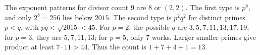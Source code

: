The exponent patterns for divisor count $9$ are $8$ or $(2,2)$. The first type is $p^8$, and only $2^8=256$ lies below $2015$. The second type is $p^2q^2$ for distinct primes $p<q$, with $pq<\sqrt{2015}<45$. For $p=2$, the possible $q$ are $3,5,7,11,13,17,19$; for $p=3$, they are $5,7,11,13$; for $p=5$, only $7$ works. Larger smaller primes give product at least $7\cdot11>44$. Thus the count is $1+7+4+1=\boxed{13}$.
